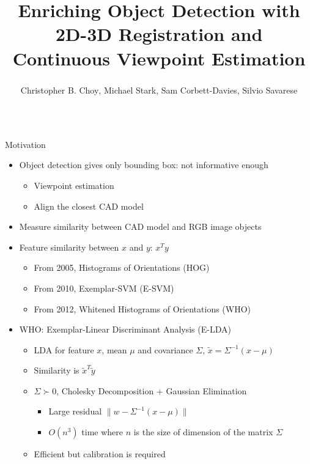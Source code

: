 \documentclass[serif,mathserif,final]{beamer}
\title{Enriching Object Detection with 2D-3D Registration and Continuous
  Viewpoint Estimation}
\author{Christopher B. Choy\textsuperscript{\dag}, Michael
  Stark\textsuperscript{\ddag}, Sam Corbett-Davies\textsuperscript{\dag},
  Silvio Savarese\textsuperscript{\dag}}
\institute{\textsuperscript{\dag}Stanford University,
  \textsuperscript{\ddag}Max Planck Institute for Informatics}
\newcommand{\1}{\mathbb{I}} %
\begin{document}
\begin{frame}{}
  \begin{columns}[t]


    \begin{column}{0.24\linewidth}


      \begin{block}{Motivation}
        \begin{itemize}
          \item Object detection gives only bounding box: not informative enough
            \begin{itemize}
              \item Viewpoint estimation
              \item Align the closest CAD model
            \end{itemize}
          \item Measure similarity between CAD model and RGB image objects
          \item Feature similarity between $x$ and $y$: $x^Ty$
            \begin{itemize}
              \item From 2005, Histograms of Orientations (HOG)
              \item From 2010, Exemplar-SVM (E-SVM)
              \item From 2012, Whitened Histograms of Orientations (WHO)
            \end{itemize}
          \item WHO: Exemplar-Linear Discriminant Analysis (E-LDA)
            \begin{itemize}
              \item LDA for feature $x$, mean $\mu$ and covariance $\Sigma$,
                $\tilde{x} = \Sigma^{-1}(x - \mu)$
              \item Similarity is $\tilde{x}^T\tilde{y}$
              \item $\Sigma \succ 0$, Cholesky Decomposition +
                Gaussian Elimination
                \begin{itemize}
                  \item Large residual $\| w - \Sigma^{-1}(x - \mu) \|$
                  \item $O(n^3)$ time where $n$ is the size of dimension of the
                    matrix $\Sigma$
                \end{itemize}
              \item Efficient but {\color{red} calibration is required}
            \end{itemize}
        \end{itemize}
      \end{block}



\end{column}
\end{columns}
\end{frame}
\end{document}
